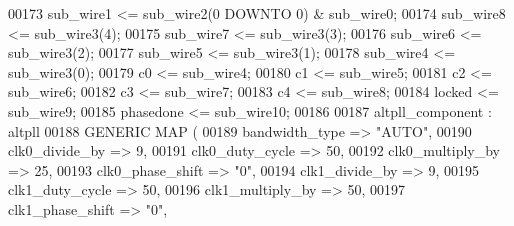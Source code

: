 \begin{DoxyCode}
{00173     \textcolor{vhdlchar}{sub_wire1}    \textcolor{vhdlchar}{<=} \textcolor{vhdlchar}{sub_wire2}\textcolor{vhdlchar}{(}\textcolor{vhdllogic}{}\textcolor{vhdllogic}{0} \textcolor{keywordflow}{DOWNTO} \textcolor{vhdllogic}{}\textcolor{vhdllogic}{0}\textcolor{vhdlchar}{)} \textcolor{vhdlchar}{&} \textcolor{vhdlchar}{sub_wire0};
00174     \textcolor{vhdlchar}{sub_wire8}    \textcolor{vhdlchar}{<=} \textcolor{vhdlchar}{sub_wire3}\textcolor{vhdlchar}{(}\textcolor{vhdllogic}{}\textcolor{vhdllogic}{4}\textcolor{vhdlchar}{)};
00175     \textcolor{vhdlchar}{sub_wire7}    \textcolor{vhdlchar}{<=} \textcolor{vhdlchar}{sub_wire3}\textcolor{vhdlchar}{(}\textcolor{vhdllogic}{}\textcolor{vhdllogic}{3}\textcolor{vhdlchar}{)};
00176     \textcolor{vhdlchar}{sub_wire6}    \textcolor{vhdlchar}{<=} \textcolor{vhdlchar}{sub_wire3}\textcolor{vhdlchar}{(}\textcolor{vhdllogic}{}\textcolor{vhdllogic}{2}\textcolor{vhdlchar}{)};
00177     \textcolor{vhdlchar}{sub_wire5}    \textcolor{vhdlchar}{<=} \textcolor{vhdlchar}{sub_wire3}\textcolor{vhdlchar}{(}\textcolor{vhdllogic}{}\textcolor{vhdllogic}{1}\textcolor{vhdlchar}{)};
00178     \textcolor{vhdlchar}{sub_wire4}    \textcolor{vhdlchar}{<=} \textcolor{vhdlchar}{sub_wire3}\textcolor{vhdlchar}{(}\textcolor{vhdllogic}{}\textcolor{vhdllogic}{0}\textcolor{vhdlchar}{)};
00179     \textcolor{vhdlchar}{c0}    \textcolor{vhdlchar}{<=} \textcolor{vhdlchar}{sub_wire4};
00180     \textcolor{vhdlchar}{c1}    \textcolor{vhdlchar}{<=} \textcolor{vhdlchar}{sub_wire5};
00181     \textcolor{vhdlchar}{c2}    \textcolor{vhdlchar}{<=} \textcolor{vhdlchar}{sub_wire6};
00182     \textcolor{vhdlchar}{c3}    \textcolor{vhdlchar}{<=} \textcolor{vhdlchar}{sub_wire7};
00183     \textcolor{vhdlchar}{c4}    \textcolor{vhdlchar}{<=} \textcolor{vhdlchar}{sub_wire8};
00184     locked    <= sub\_wire9;
00185     \textcolor{vhdlchar}{phasedone}    \textcolor{vhdlchar}{<=} \textcolor{vhdlchar}{sub_wire10};
00186 
00187     altpll_component : altpll
00188     \textcolor{keywordflow}{GENERIC} \textcolor{keywordflow}{MAP} (
00189         bandwidth\_type => \textcolor{keyword}{"AUTO"},
00190         clk0\_divide\_by => \textcolor{vhdllogic}{9},
00191         clk0\_duty\_cycle => \textcolor{vhdllogic}{50},
00192         clk0\_multiply\_by => \textcolor{vhdllogic}{25},
00193         clk0\_phase\_shift => "\textcolor{vhdllogic}{0}",
00194         clk1\_divide\_by => \textcolor{vhdllogic}{9},
00195         clk1\_duty\_cycle => \textcolor{vhdllogic}{50},
00196         clk1\_multiply\_by => \textcolor{vhdllogic}{50},
00197         clk1\_phase\_shift => "\textcolor{vhdllogic}{0}",
}
\end{DoxyCode}
